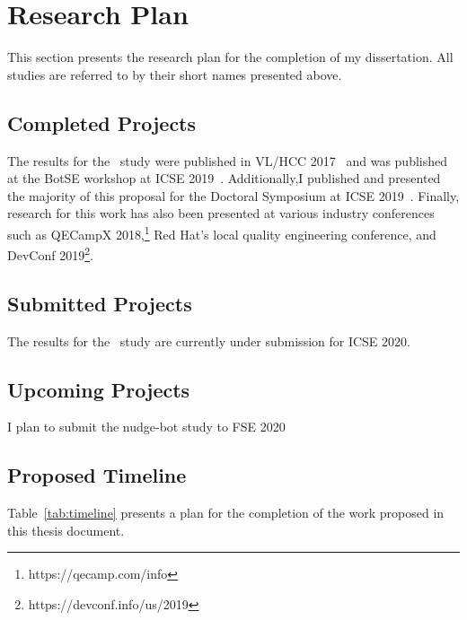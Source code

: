 \section{Research Plan}

This section presents the research plan for the completion of my dissertation. All studies are referred to by their short names presented above.

\subsection{Completed Projects}

The results for the \peer~study were published in VL/HCC 2017~\cite{VLHCC} and \tele was published at the BotSE workshop at ICSE 2019~\cite{BotSE}. Additionally,I published and presented the majority of this proposal for the Doctoral Symposium at ICSE 2019~\cite{Symposium}. Finally, research for this work has also been presented at various industry conferences such as QECampX 2018,\footnote{https://qecamp.com/info} Red Hat's local quality engineering conference, and DevConf 2019\footnote{https://devconf.info/us/2019}.

\subsection{Submitted Projects}

The results for the \sugg~study are currently under submission for ICSE 2020.

\subsection{Upcoming Projects}

I plan to submit the nudge-bot study to FSE 2020

\subsection{Proposed Timeline}
 Table~\ref{tab:timeline} presents a plan for the completion of the work proposed in this thesis document.

